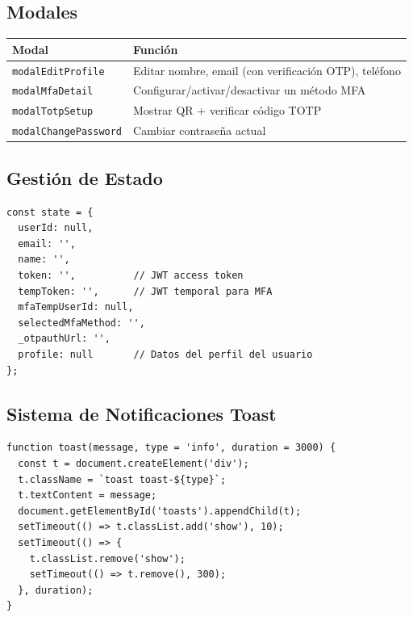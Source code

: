 \documentclass[12pt,a4paper,openany]{article}
\begin{document}
\subsection{Modales}

\begin{table}[H]
\centering
\begin{tabular}{@{}ll@{}}
\toprule
\textbf{Modal} & \textbf{Función} \\
\midrule
\texttt{modalEditProfile} & Editar nombre, email (con verificación OTP), teléfono \\
\texttt{modalMfaDetail} & Configurar/activar/desactivar un método MFA \\
\texttt{modalTotpSetup} & Mostrar QR + verificar código TOTP \\
\texttt{modalChangePassword} & Cambiar contraseña actual \\
\bottomrule
\end{tabular}
\end{table}

\subsection{Gestión de Estado}

\begin{lstlisting}[style=jsstyle, caption={Estado global de la aplicación SPA}]
const state = {
  userId: null,
  email: '',
  name: '',
  token: '',          // JWT access token
  tempToken: '',      // JWT temporal para MFA
  mfaTempUserId: null,
  selectedMfaMethod: '',
  _otpauthUrl: '',
  profile: null       // Datos del perfil del usuario
};
\end{lstlisting}

\subsection{Sistema de Notificaciones Toast}

\begin{lstlisting}[style=jsstyle, caption={Sistema de notificaciones}]
function toast(message, type = 'info', duration = 3000) {
  const t = document.createElement('div');
  t.className = `toast toast-${type}`;
  t.textContent = message;
  document.getElementById('toasts').appendChild(t);
  setTimeout(() => t.classList.add('show'), 10);
  setTimeout(() => {
    t.classList.remove('show');
    setTimeout(() => t.remove(), 300);
  }, duration);
}
\end{lstlisting}
\end{document}
